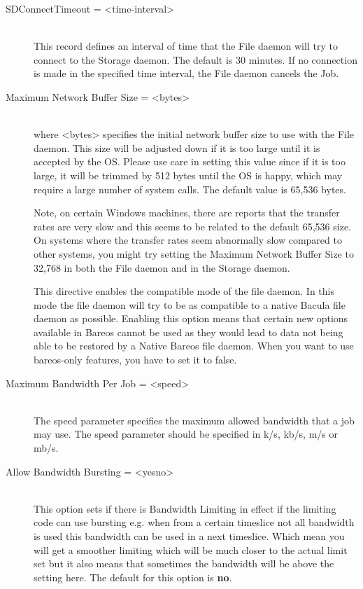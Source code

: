 \begin{description}
\item [SDConnectTimeout = {\textless}time-interval{\textgreater}] \hfill \\
This  record defines an interval of time that  the File daemon will try to
connect to the  Storage daemon. The default is 30 minutes. If no connection
is made in the specified time interval, the File daemon  cancels the Job.

\item [Maximum Network Buffer Size = {\textless}bytes{\textgreater}] \hfill \\
where {\textless}bytes{\textgreater} specifies the initial network buffer  size to use with
the File daemon. This size will be adjusted down  if it is too large until it
is accepted by the OS. Please use  care in setting this value since if it is
too large, it will  be trimmed by 512 bytes until the OS is happy, which may
require  a large number of system calls. The default value is 65,536 bytes.

Note, on certain Windows machines, there are reports that the
transfer rates are very slow and this seems to be related to
the default 65,536 size. On systems where the transfer rates
seem abnormally slow compared to other systems, you might try
setting the Maximum Network Buffer Size to 32,768 in both the
File daemon and in the Storage daemon.

This directive enables the compatible mode of the file daemon. In
this mode the file daemon will try to be as compatible to a native
Bacula file daemon as possible. Enabling this option means that
certain new options available in Bareos cannot be used as they would
lead to data not being able to be restored by a Native Bareos file daemon.
When you want to use bareos-only features, you have to set it to false.

\item [Maximum Bandwidth Per Job = {\textless}speed{\textgreater}] \hfill \\
The speed parameter specifies the maximum allowed bandwidth that a job may
use. The speed parameter should be specified in k/s, kb/s, m/s or mb/s.

\item [Allow Bandwidth Bursting = {\textless}yes{\textbar}no{\textgreater}] \hfill \\
This option sets if there is Bandwidth Limiting in effect if the limiting
code can use bursting e.g. when from a certain timeslice not all bandwidth
is used this bandwidth can be used in a next timeslice. Which mean you will
get a smoother limiting which will be much closer to the actual limit set
but it also means that sometimes the bandwidth will be above the setting here.
The default for this option is {\bf no}.


\end{description}
